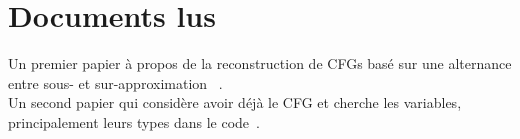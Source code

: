 \documentclass[a4paper,8pt]{article}
\begin{document}
\section{Documents lus}

Un premier papier à propos de la reconstruction de CFGs basé sur une
alternance entre sous- et sur-approximation~
\cite{alternating_CFG_reconstruction}. \\
Un second papier qui considère avoir déjà le CFG et cherche les variables,
principalement leurs types dans le code~\cite{divine}.





\end{document}
